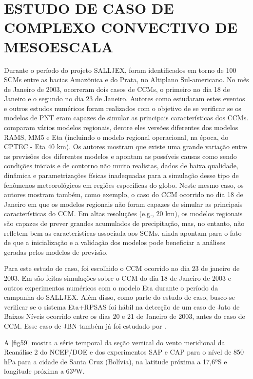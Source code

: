 \hypertarget{estilo:capitulo}{}
\chapter{ESTUDO DE CASO DE COMPLEXO CONVECTIVO DE MESOESCALA}
\label{ss:cap4}

Durante o período do projeto SALLJEX, foram identificados em torno de 100 SCMs entre as bacias Amazônica e do Prata, no Altiplano Sul-americano. No mês de Janeiro de 2003, ocorreram dois casos de CCMs, o primeiro no dia 18 de Janeiro e o segundo no dia 23 de Janeiro. Autores como  estudaram estes eventos e outros estudos numéricos foram realizados com o objetivo de se verificar se os modelos de PNT eram capazes de simular as principais características dos CCMs.  comparam vários modelos regionais, dentre eles versões diferentes dos modelos RAMS, MM5 e Eta (incluindo o modelo regional operacional, na época, do CPTEC - Eta 40 km). Os autores mostram que existe uma grande variação entre as previsões dos diferentes modelos e apontam as possíveis causas como sendo condições iniciais e de contorno não muito realistas, dados de baixa qualidade, dinâmica e parametrizações físicas inadequadas para a simulação desse tipo de fenômenos meteorológicos em regiões específicas do globo. Neste mesmo caso, os autores mostram também, como exemplo, o caso do CCM ocorrido no dia 18 de Janeiro em que os modelos regionais não foram capazes de simular as principais características do CCM. Em altas resoluções (e.g., 20 km), os modelos regionais são capazes de prever grandes acumulados de precipitação, mas, no entanto, não refletem bem as características associada aos SCMs.  ainda apontam para o fato de que a inicialização e a validação dos modelos pode beneficiar a análises geradas pelos modelos de previsão.

Para este estudo de caso, foi escolhido o CCM ocorrido no dia 23 de janeiro de 2003. Em  são feitas simulações sobre o CCM do dia 18 de Janeiro de 2003 e outros experimentos numéricos com o modelo Eta durante o período da campanha do SALLJEX. Além disso, como parte do estudo de caso, busco-se verificar se o sistema Eta+RPSAS foi hábil na detecção de um caso de Jato de Baixos Níveis ocorrido entre os dias 20 e 21 de Janeiro de 2003, antes do caso de CCM. Esse caso de JBN também já foi estudado por .

A \autoref{fig59} mostra a série temporal da seção vertical do vento meridional da Reanálise 2 do NCEP/DOE e dos experimentos SAP e CAP para o nível de 850 hPa para a cidade de Santa Cruz (Bolívia), na latitude próxima a 17,6ºS e longitude próxima a 63ºW.

